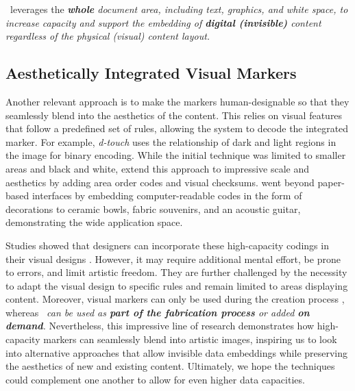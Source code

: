 \systemName~leverages the \textit{\textbf{whole} document area, including text, graphics, and white space, to increase capacity and support the embedding of \textbf{digital (invisible)} content regardless of the physical (visual) content layout.}



\subsection{Aesthetically Integrated Visual Markers}
Another relevant approach is to make the markers human-designable so that they seamlessly blend into the aesthetics of the content.
This relies on visual features that follow a predefined set of rules, allowing the system to decode the integrated marker. 
For example, \textit{d-touch} \cite{Enrico_visualMarkers_2009} uses the relationship of dark and light regions in the image for binary encoding.
While the initial technique was limited to smaller areas and black and white, \citet{Preston_MarkerScale_2017} extend this approach to impressive scale and aesthetics by adding area order codes and visual checksums.
\citet{Benford_Decoration_2017} went beyond paper-based interfaces by embedding computer-readable codes in the form of decorations to ceramic bowls, fabric souvenirs, and an acoustic guitar, demonstrating the wide application space.

Studies showed that designers can incorporate these high-capacity codings in their visual designs \cite{Enrico_visualMarkers_2009, Jung_HumanDesignable_2019}.
However, it may require additional mental effort, be prone to errors, and limit artistic freedom.
They are further challenged by the necessity to adapt the visual design to specific rules and remain limited to areas displaying content. Moreover, visual markers can only be used during the creation process \cite{Jung_HumanMarker_2019}, whereas \systemName~\textit{can be used as \textbf{part of the fabrication process} or added \textbf{on demand}.}
Nevertheless, this impressive line of research demonstrates how high-capacity markers can seamlessly blend into artistic images, inspiring us to look into alternative approaches that allow invisible data embeddings while preserving the aesthetics of new and existing content.
Ultimately, we hope the techniques could complement one another to allow for even higher data capacities.




